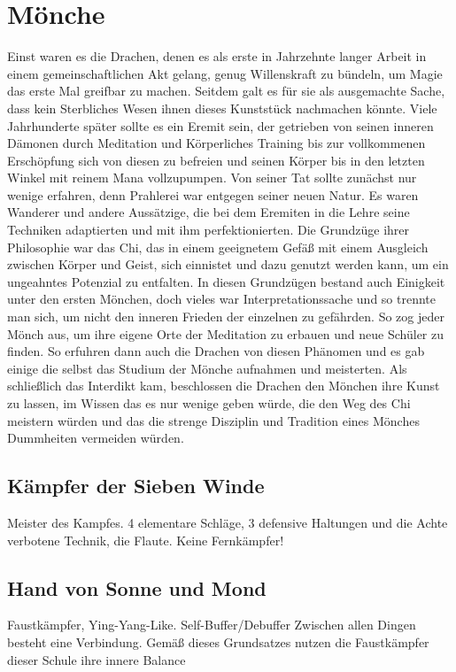 \documentclass[a4paper,12pt,oneside]{book}
\begin{document}
\section{Mönche}
Einst waren es die Drachen, denen es als erste in Jahrzehnte langer Arbeit in einem gemeinschaftlichen Akt gelang, genug Willenskraft zu bündeln, um Magie das erste Mal greifbar zu machen. Seitdem galt es für sie als ausgemachte Sache, dass kein Sterbliches Wesen ihnen dieses Kunststück nachmachen könnte. Viele Jahrhunderte später sollte es ein Eremit sein, der getrieben von seinen inneren Dämonen durch Meditation und Körperliches Training bis zur vollkommenen Erschöpfung sich von diesen zu befreien und seinen Körper bis in den letzten Winkel mit reinem Mana vollzupumpen. Von seiner Tat sollte zunächst nur wenige erfahren, denn Prahlerei war entgegen seiner neuen Natur. Es waren Wanderer und andere Aussätzige, die bei dem Eremiten in die Lehre seine Techniken adaptierten und mit ihm perfektionierten. Die Grundzüge ihrer Philosophie war das Chi, das in einem geeignetem Gefäß mit einem Ausgleich zwischen Körper und Geist, sich einnistet und dazu genutzt werden kann, um ein ungeahntes Potenzial zu entfalten. In diesen Grundzügen bestand auch Einigkeit unter den ersten Mönchen, doch vieles war Interpretationssache und so trennte man sich, um nicht den inneren Frieden der einzelnen zu gefährden. So zog jeder Mönch aus, um ihre eigene Orte der Meditation zu erbauen und neue Schüler zu finden. So erfuhren dann auch die Drachen von diesen Phänomen und es gab einige die selbst das Studium der Mönche aufnahmen und meisterten. Als schließlich das Interdikt kam, beschlossen die Drachen den Mönchen ihre Kunst zu lassen, im Wissen das es nur wenige geben würde, die den Weg des Chi meistern würden und das die strenge Disziplin und Tradition eines Mönches Dummheiten vermeiden würden.

\subsection{Kämpfer der Sieben Winde}
Meister des Kampfes. 4 elementare Schläge, 3 defensive Haltungen und die Achte verbotene Technik, die Flaute. Keine Fernkämpfer!

\subsection{Hand von Sonne und Mond}
Faustkämpfer, Ying-Yang-Like. Self-Buffer/Debuffer
Zwischen allen Dingen besteht eine Verbindung. Gemäß dieses Grundsatzes nutzen die Faustkämpfer dieser Schule ihre innere Balance 
\end{document}
